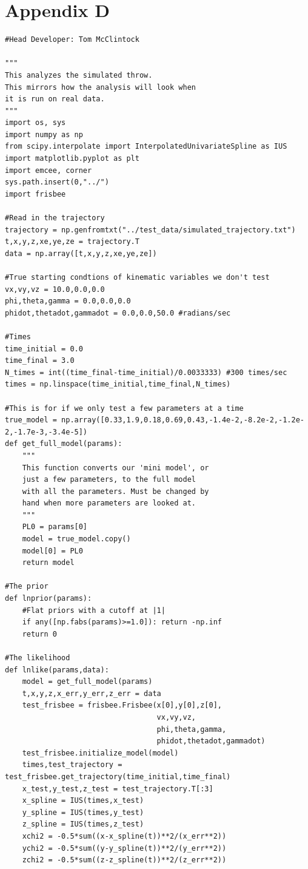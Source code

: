 \documentclass[a4paper,12pt, oneside]{article}
\begin{document}
\section*{Appendix D}
\begin{verbatim}
#Head Developer: Tom McClintock

"""
This analyzes the simulated throw.
This mirrors how the analysis will look when
it is run on real data.
"""
import os, sys
import numpy as np
from scipy.interpolate import InterpolatedUnivariateSpline as IUS
import matplotlib.pyplot as plt
import emcee, corner
sys.path.insert(0,"../")
import frisbee

#Read in the trajectory
trajectory = np.genfromtxt("../test_data/simulated_trajectory.txt")
t,x,y,z,xe,ye,ze = trajectory.T
data = np.array([t,x,y,z,xe,ye,ze])

#True starting condtions of kinematic variables we don't test
vx,vy,vz = 10.0,0.0,0.0
phi,theta,gamma = 0.0,0.0,0.0
phidot,thetadot,gammadot = 0.0,0.0,50.0 #radians/sec

#Times
time_initial = 0.0
time_final = 3.0
N_times = int((time_final-time_initial)/0.0033333) #300 times/sec
times = np.linspace(time_initial,time_final,N_times)

#This is for if we only test a few parameters at a time
true_model = np.array([0.33,1.9,0.18,0.69,0.43,-1.4e-2,-8.2e-2,-1.2e-2,-1.7e-3,-3.4e-5])
def get_full_model(params):
    """
    This function converts our 'mini model', or
    just a few parameters, to the full model
    with all the parameters. Must be changed by
    hand when more parameters are looked at.
    """
    PL0 = params[0]
    model = true_model.copy()
    model[0] = PL0
    return model

#The prior
def lnprior(params):
    #Flat priors with a cutoff at |1|
    if any([np.fabs(params)>=1.0]): return -np.inf
    return 0

#The likelihood
def lnlike(params,data):
    model = get_full_model(params)
    t,x,y,z,x_err,y_err,z_err = data
    test_frisbee = frisbee.Frisbee(x[0],y[0],z[0],
                                   vx,vy,vz,
                                   phi,theta,gamma,
                                   phidot,thetadot,gammadot)
    test_frisbee.initialize_model(model)
    times,test_trajectory = test_frisbee.get_trajectory(time_initial,time_final)
    x_test,y_test,z_test = test_trajectory.T[:3]
    x_spline = IUS(times,x_test)
    y_spline = IUS(times,y_test)
    z_spline = IUS(times,z_test)
    xchi2 = -0.5*sum((x-x_spline(t))**2/(x_err**2))
    ychi2 = -0.5*sum((y-y_spline(t))**2/(y_err**2))
    zchi2 = -0.5*sum((z-z_spline(t))**2/(z_err**2))


\end{verbatim}
\end{document}
